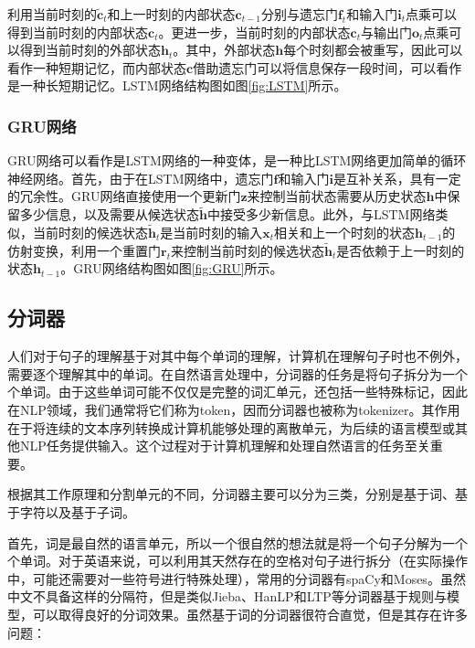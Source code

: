 利用当前时刻的$\tilde{\boldsymbol {c}}_t$和上一时刻的内部状态$\boldsymbol  {c}_{t-1}$分别与遗忘门$\boldsymbol f_t$和输入门$\boldsymbol i_t$点乘可以得到当前时刻的内部状态$\boldsymbol  {c}_{t}$。更进一步，当前时刻的内部状态$\boldsymbol  {c}_{t}$与输出门$\boldsymbol {o}_t$点乘可以得到当前时刻的外部状态$\boldsymbol  {h}_t$。其中，外部状态$\boldsymbol  {h}$每个时刻都会被重写，因此可以看作一种短期记忆，而内部状态$\boldsymbol  {c}$借助遗忘门可以将信息保存一段时间，可以看作是一种长短期记忆。LSTM网络结构图如图\ref{fig:LSTM}所示。



\subsubsection{GRU网络}

GRU网络可以看作是LSTM网络的一种变体，是一种比LSTM网络更加简单的循环神经网络。首先，由于在LSTM网络中，遗忘门$\boldsymbol f$和输入门$\boldsymbol i$是互补关系，具有一定的冗余性。GRU网络直接使用一个更新门$\boldsymbol z$来控制当前状态需要从历史状态$\boldsymbol h$中保留多少信息，以及需要从候选状态$\tilde{\boldsymbol{h}}$中接受多少新信息。此外，与LSTM网络类似，当前时刻的候选状态$\tilde{\boldsymbol{h}}_t$是当前时刻的输入$\boldsymbol     {x}_t$相关和上一个时刻的状态$\boldsymbol {h}_{t-1}$的仿射变换，利用一个重置门$\boldsymbol r_t$来控制当前时刻的候选状态$\tilde{\boldsymbol{h}}_t$是否依赖于上一时刻的状态$\boldsymbol {h}_{t-1}$。GRU网络结构图如图\ref{fig:GRU}所示。



\subsection{分词器}

人们对于句子的理解基于对其中每个单词的理解，计算机在理解句子时也不例外，需要逐个理解其中的单词。在自然语言处理中，分词器的任务是将句子拆分为一个个单词。由于这些单词可能不仅仅是完整的词汇单元，还包括一些特殊标记，因此在NLP领域，我们通常将它们称为token，因而分词器也被称为tokenizer。其作用在于将连续的文本序列转换成计算机能够处理的离散单元，为后续的语言模型或其他NLP任务提供输入。这个过程对于计算机理解和处理自然语言的任务至关重要。

根据其工作原理和分割单元的不同，分词器主要可以分为三类，分别是基于词、基于字符以及基于子词。

首先，词是最自然的语言单元，所以一个很自然的想法就是将一个句子分解为一个个单词。对于英语来说，可以利用其天然存在的空格对句子进行拆分（在实际操作中，可能还需要对一些符号进行特殊处理），常用的分词器有spaCy和Moses。虽然中文不具备这样的分隔符，但是类似Jieba、HanLP和LTP等分词器基于规则与模型，可以取得良好的分词效果。虽然基于词的分词器很符合直觉，但是其存在许多问题：

